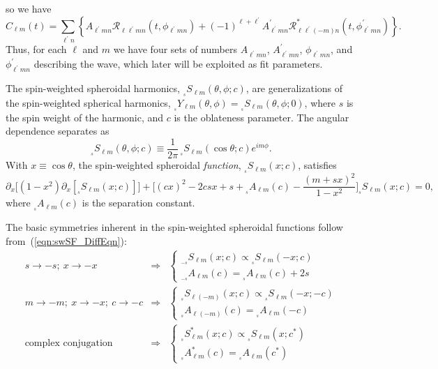 \documentclass[11pt]{article}
\newcommand{\swY}[4][]{{}_{{}_{#2}}\!Y^{#1}_{#3}(#4)}
\newcommand{\swSH}[5][]{{}_{{}_{#2}}S^{#1}_{#3}(#4;#5)}
\newcommand{\swS}[5][]{{}_{{}_{#2}}S^{#1}_{#3}(#4;#5)}
\newcommand{\scA}[4][]{{}_{{}_{#2}}A^{#1}_{#3}(#4)}
\begin{document}
so we have
\begin{equation}
 C_{\ell{m}}(t) = \sum_{\ell^\prime{n}} \left\{ 
   A_{\ell^\prime{m}n}\mathcal{R}_{\ell\ell^\prime{m}n}(t,\phi_{\ell^\prime{m}n})
  + (-1)^{\ell+\ell^\prime} A^\prime_{\ell^\prime{m}n}
     \mathcal{R}^*_{\ell\ell^\prime(-m)n}(t,\phi^\prime_{\ell^\prime{m}n})
     \right\}.
\end{equation}
Thus, for each $\ell$ and $m$ we have four sets of numbers $A_{\ell^\prime{m}n}$, $A^\prime_{\ell^\prime{m}n}$, $\phi_{\ell^\prime{m}n}$, and $\phi^\prime_{\ell^\prime{m}n}$ describing the wave, which later will be exploited as fit parameters.

\newpage
{}
\vspace{0.25in}

The spin-weighted spheroidal harmonics,
$\swSH{s}{\ell{m}}{\theta,\phi}{c}$, are generalizations of the
spin-weighted spherical harmonics,
$\swY{s}{\ell{m}}{\theta,\phi}=\swSH{s}{\ell{m}}{\theta,\phi}{0}$,
where $s$ is the spin weight of the harmonic, and $c$ is the
oblateness parameter.  The angular dependence separates as
\begin{equation}
  \swSH{s}{\ell{m}}{\theta,\phi}{c} \equiv 
  \frac1{2\pi}\,\swS{s}{\ell{m}}{\cos\theta}{c}e^{im\phi}.
\end{equation}
With $x\equiv\cos\theta$, the spin-weighted spheroidal {\em function},
$\swS{s}{\ell{m}}{x}{c}$, satisfies
\begin{equation}\label{eqn:swSF_DiffEqn}
\partial_x \Big[ (1-x^2)\partial_x [\swS{s}{\ell{m}}{x}{c}]\Big] 
    + \bigg[(cx)^2 - 2 csx + s + \scA{s}{\ell m}{c} 
      - \frac{(m+sx)^2}{1-x^2}\bigg]\swS{s}{\ell{m}}{x}{c} = 0,
\end{equation}
where $\scA{s}{\ell m}{c}$ is the separation constant.

The basic symmetries inherent in the spin-weighted spheroidal functions
follow from~(\ref{eqn:swSF_DiffEqn}):
\begin{eqnarray}
s\rightarrow-s;\ x\rightarrow-x &\Rightarrow&
    \left\{\begin{array}{c}\swS{-s}{\ell{m}}{x}{c}\propto\swS{s}{\ell{m}}{-x}{c} \\
        \scA{-s}{\ell{m}}{c} = \scA{s}{\ell{m}}{c} + 2s \end{array}\right. \\
m\rightarrow-m;\ x\rightarrow-x;\ c\rightarrow-c &\Rightarrow&
    \left\{\begin{array}{c}\swS{s}{\ell(-m)}{x}{c}\propto\swS{s}{\ell{m}}{-x}{-c}\\
        \scA{s}{\ell(-m)}{c} = \scA{s}{\ell{m}}{-c} \end{array}\right. \\
\mbox{complex conjugation} &\Rightarrow&
    \left\{\begin{array}{c} \swS[*]{s}{\ell{m}}{x}{c}\propto\swS{s}{\ell{m}}{x}{c^*} \\
        \scA[*]{s}{\ell{m}}{c} = \scA{s}{\ell{m}}{c^*} \end{array}\right.
\end{eqnarray}
\end{document}
